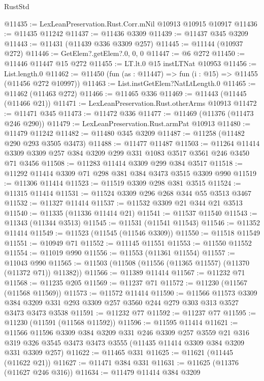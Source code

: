 \begin{lexlean}{RustStd}
\begin{coremodule}
{{{{{{{{{{{{{{{{{{{@11435 := LexLeanPreservation.Rust.Corr.mNil @10913 @10915 @10917
@11436 := @11435 @11242
@11437 := @11436 @3309
@11439 := @11437 @345 @3209
@11443 := @11431 (@11439 @336 @3309 @257)
@11445 := @11144 (@10937 @272)
@11446 := GetElem?.getElem?.{0, 0, 0}
@11447 := @6 @272
@11450 := @11446 @11447 @15 @272
@11455 := LT.lt.{0} @15 instLTNat @10953
@11456 := List.length.{0}
@11462 := @11450 (fun (as : @11447) => fun (i : @15) => @11455 (@11456 @272 @10997))
@11463 := List.instGetElem?NatLtLength.{0}
@11465 := @11462 (@11463 @272)
@11466 := @11465 @336
@11469 := @11443 (@11445 (@11466 @21))
@11471 := LexLeanPreservation.Rust.otherArms @10913
@11472 := @11471 @345
@11473 := @11472 @336
@11477 := @11469 (@11376 (@11473 @246 @290))
@11479 := LexLeanPreservation.Rust.armPat @10913
@11480 := @11479 @11242
@11482 := @11480 @345 @3209
@11487 := @11258 (@11482 @290 @293 @3505 @3473)
@11488 := @11477 @11487
@11503 := @11264 @11414 @3309 @3309 @257 @384 @3209 @299 @331 @1083 @3517 @3561 @246 @3450 @71 @3456
@11508 := @11283 @11414 @3309 @299 @384 @3517
@11518 := @11292 @11414 @3309 @71 @298 @381 @384 @3473 @3515 @3309 @990
@11519 := @11306 @11414
@11523 := @11519 @3309 @298 @381 @3515
@11524 := @11315 @11414
@11531 := @11524 @3309 @296 @268 @344 @55 @3513 @3467
@11532 := @11327 @11414
@11537 := @11532 @3309 @21 @344 @21 @3513
@11540 := @11335 (@11336 @11414 @21)
@11541 := @11537 @11540
@11543 := @11343 (@11344 @3513)
@11545 := @11531 (@11541 @11543)
@11546 := @11352 @11414
@11549 := @11523 (@11545 (@11546 @3309))
@11550 := @11518 @11549
@11551 := @10949 @71
@11552 := @11145 @11551
@11553 := @11550 @11552
@11554 := @11019 @990
@11556 := @11553 (@11361 @11554)
@11557 := @11043 @990
@11565 := @11503 (@11508 (@11556 (@11365 @11557) (@11370 (@11372 @71)) @11382))
@11566 := @11389 @11414
@11567 := @11232 @71
@11568 := @11235 @205
@11569 := @11237 @71
@11572 := @11230 (@11567 (@11568 @11569))
@11573 := @11572 @11414
@11590 := @11566
    @11573
    @3309
    @384
    @3209
    @331
    @293
    @3309
    @257
    @3560
    @244
    @279
    @303
    @313
    @3527
    @3473
    @3473
    @3538
@11591 := @11232 @77
@11592 := @11237 @77
@11595 := @11230 (@11591 (@11568 @11592))
@11596 := @11595 @11414
@11621 := @11566
    @11596
    @3309
    @384
    @3209
    @331
    @246
    @3309
    @257
    @3559
    @21
    @316
    @319
    @326
    @3545
    @3473
    @3473
    @3555
    (@11435 @11414 @3309 @384 @3209 @331 @3309 @257)
@11622 := @11465 @331
@11625 := @11621 (@11445 (@11622 @21))
@11627 := @11471 @384 @331
@11631 := @11625 (@11376 (@11627 @246 @316))
@11634 := @11479 @11414 @384 @3209
}}}}}}}}}}}}}}}}}}}
\end{coremodule}
\end{lexlean}
